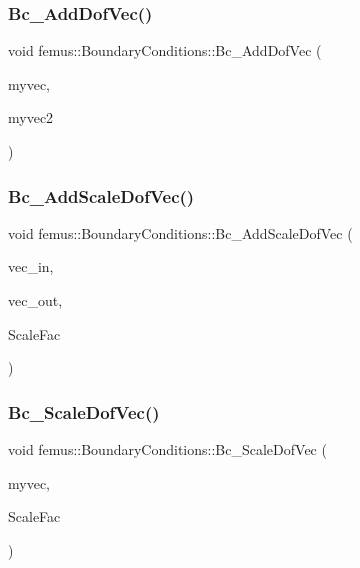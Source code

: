 \subsubsection{\texorpdfstring{Bc\+\_\+\+Add\+Dof\+Vec()}{Bc\_AddDofVec()}}
{\footnotesize\ttfamily void femus\+::\+Boundary\+Conditions\+::\+Bc\+\_\+\+Add\+Dof\+Vec (\begin{DoxyParamCaption}\item[{\mbox{\hyperlink{classfemus_1_1_numeric_vector}{Numeric\+Vector}} $\ast$}]{myvec,  }\item[{\mbox{\hyperlink{classfemus_1_1_numeric_vector}{Numeric\+Vector}} $\ast$}]{myvec2 }\end{DoxyParamCaption})}

\mbox{\label{classfemus_1_1_boundary_conditions_a214920d556d9716237f392bb1d1ab316}} 
\subsubsection{\texorpdfstring{Bc\+\_\+\+Add\+Scale\+Dof\+Vec()}{Bc\_AddScaleDofVec()}}
{\footnotesize\ttfamily void femus\+::\+Boundary\+Conditions\+::\+Bc\+\_\+\+Add\+Scale\+Dof\+Vec (\begin{DoxyParamCaption}\item[{\mbox{\hyperlink{classfemus_1_1_numeric_vector}{Numeric\+Vector}} $\ast$}]{vec\+\_\+in,  }\item[{\mbox{\hyperlink{classfemus_1_1_numeric_vector}{Numeric\+Vector}} $\ast$}]{vec\+\_\+out,  }\item[{const double}]{Scale\+Fac }\end{DoxyParamCaption})}

\mbox{\label{classfemus_1_1_boundary_conditions_a72672b4fab37f53c790f3d6e4414dc9a}} 
\subsubsection{\texorpdfstring{Bc\+\_\+\+Scale\+Dof\+Vec()}{Bc\_ScaleDofVec()}}
{\footnotesize\ttfamily void femus\+::\+Boundary\+Conditions\+::\+Bc\+\_\+\+Scale\+Dof\+Vec (\begin{DoxyParamCaption}\item[{\mbox{\hyperlink{classfemus_1_1_numeric_vector}{Numeric\+Vector}} $\ast$}]{myvec,  }\item[{double}]{Scale\+Fac }\end{DoxyParamCaption})}

